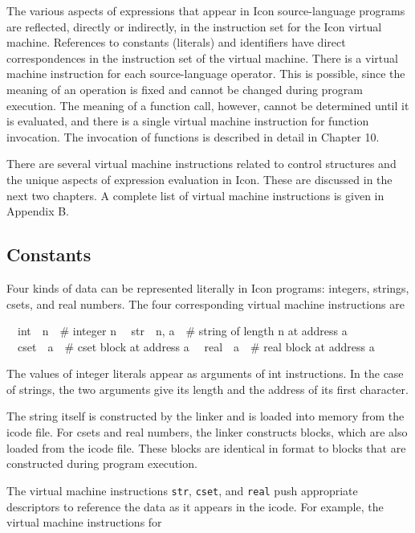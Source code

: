 The various aspects of expressions that appear in Icon source-language
programs are reflected, directly or indirectly, in the instruction set
for the Icon virtual machine. References to constants (literals) and
identifiers have direct correspondences in the instruction set of the
virtual machine. There is a virtual machine instruction for each
source-language operator. This is possible, since the meaning of an
operation is fixed and cannot be changed during program execution. The
meaning of a function call, however, cannot be determined until it is
evaluated, and there is a single virtual machine instruction for
function invocation. The invocation of functions is described in
detail in Chapter 10.

There are several virtual machine instructions related to control
structures and the unique aspects of expression evaluation in
Icon. These are discussed in the next two chapters. A complete list of
virtual machine instructions is given in Appendix B.

\subsection{Constants}

Four kinds of data can be represented literally in Icon programs:
integers, strings, csets, and real numbers. The four corresponding
virtual machine instructions are

{\ttfamily\mdseries
\ \ int\ \ n\ \ \# integer n\newline
\ \ str\ \ n, a\ \ \# string of length n at address a\newline
\ \ cset\ \ a\ \ \# cset block at address a\newline
\ \ real\ \ a\ \ \# real block at address a}

The values of integer literals appear as arguments of int
instructions. In the case of strings, the two arguments give its
length and the address of its first character.

The string itself is constructed by the linker and is loaded into
memory from the icode file. For csets and real numbers, the linker
constructs blocks, which are also loaded from the icode file. These
blocks are identical in format to blocks that are constructed during
program execution.

The virtual machine instructions \texttt{str}, \texttt{cset}, and
\texttt{real} push appropriate descriptors to reference the data as it
appears in the icode. For example, the virtual machine instructions
for

